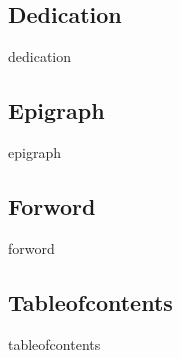 
\subsection{Dedication}\label{dedication}

dedication

\subsection{Epigraph}\label{epigraph}

epigraph

\subsection{Forword}\label{forword}

forword

\subsection{Tableofcontents}\label{tableofcontents}

tableofcontents
